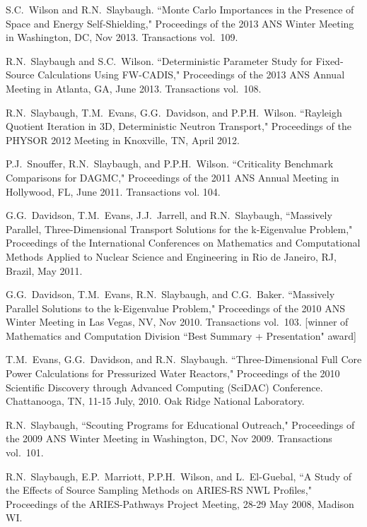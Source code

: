\begin{bibsection}
\item S.C.\ Wilson and R.N.\ Slaybaugh. ``Monte Carlo Importances in the Presence of Space and Energy Self-Shielding," Proceedings of the 2013 ANS Winter Meeting in Washington, DC, Nov 2013. Transactions vol.\ 109.

\item R.N.\ Slaybaugh and  S.C.\ Wilson. ``Deterministic Parameter Study for Fixed-Source Calculations Using FW-CADIS," Proceedings of the 2013 ANS Annual Meeting in Atlanta, GA, June 2013. Transactions vol.\ 108.

\item R.N.\ Slaybaugh, T.M.\ Evans, G.G.\ Davidson, and P.P.H.\ Wilson. ``Rayleigh Quotient Iteration in 3D, Deterministic Neutron Transport," Proceedings of the PHYSOR 2012 Meeting in Knoxville, TN, April 2012.

\item P.J.\ Snouffer, R.N.\ Slaybaugh, and P.P.H.\ Wilson. ``Criticality Benchmark Comparisons for DAGMC," Proceedings of the 2011 ANS Annual Meeting in Hollywood, FL, June 2011. Transactions vol. 104.

\item G.G.\ Davidson, T.M.\ Evans, J.J.\ Jarrell, and R.N.\ Slaybaugh, ``Massively Parallel, Three-Dimensional Transport Solutions for the k-Eigenvalue Problem," Proceedings of the International Conferences on Mathematics and Computational Methods Applied to Nuclear Science and Engineering in Rio de Janeiro, RJ, Brazil, May 2011.

\item G.G.\ Davidson, T.M.\ Evans, R.N.\ Slaybaugh, and C.G.\ Baker.  ``Massively Parallel Solutions to the k-Eigenvalue Problem," Proceedings of the 2010 ANS Winter Meeting in Las Vegas, NV, Nov 2010. Transactions vol.\ 103. [winner of Mathematics and Computation Division ``Best Summary + Presentation" award]

\item T.M.\ Evans, G.G.\ Davidson, and R.N.\ Slaybaugh.  ``Three-Dimensional Full Core Power Calculations for Pressurized Water Reactors," Proceedings of the 2010 Scientific Discovery through Advanced Computing (SciDAC) Conference. Chattanooga, TN, 11-15 July, 2010. Oak Ridge National Laboratory.

\item R.N.\ Slaybaugh, ``Scouting Programs for Educational Outreach," Proceedings of the 2009 ANS Winter Meeting in Washington, DC, Nov 2009. Transactions vol.\ 101.

\item R.N.\ Slaybaugh, E.P.\ Marriott, P.P.H.\ Wilson, and L.\ El-Guebal, ``A Study of the Effects of Source Sampling Methods on ARIES-RS NWL Profiles," Proceedings of the ARIES-Pathways Project Meeting, 28-29 May 2008, Madison WI. 


\end{bibsection}
